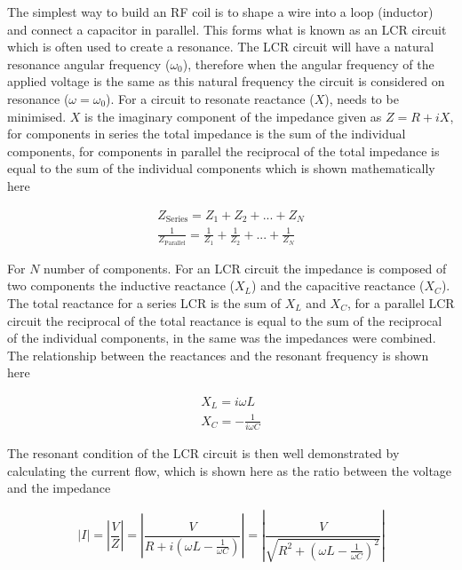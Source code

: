 The simplest way to build an \ac{RF} coil is to shape a wire into a loop (inductor) and connect a capacitor in parallel. This forms what is known as an LCR circuit which is often used to create a resonance. The LCR circuit will have a natural resonance angular frequency ($\omega_0$), therefore when the angular frequency of the applied voltage is the same as this natural frequency the circuit is considered on resonance ($\omega=\omega_0$). For a circuit to resonate reactance ($X$), needs to be minimised. $X$ is the imaginary component of the impedance given as $Z = R+iX$, for components in series the total impedance is the sum of the individual components, for components in parallel the reciprocal of the total impedance is equal to the sum of the individual components which is shown mathematically here 

\begin{equation}
    \begin{gathered}
        Z_\text{Series} = Z_1 + Z_2 + ... + Z_N \\
        \frac{1}{Z_\text{Parallel}} = \frac{1}{Z_1} + \frac{1}{Z_2} + ... + \frac{1}{Z_N}
    \end{gathered}
\end{equation}

For $N$ number of components. For an LCR circuit the impedance is composed of two components the inductive reactance ($X_L$) and the capacitive reactance ($X_C$). The total reactance for a series LCR is the sum of $X_L$ and $X_C$, for a parallel LCR circuit the reciprocal of the total reactance is equal to the sum of the reciprocal of the individual components, in the same was the impedances were combined. The relationship between the reactances and the resonant frequency is shown here

\begin{equation}
\begin{gathered}
    X_L = i\omega L \\
    X_C = -\frac{1}{i\omega C}
    \label{eqn:coils:X}
\end{gathered}
\end{equation}

The resonant condition of the LCR circuit is then well demonstrated by calculating the current flow, which is shown here as the ratio between the voltage and the impedance

\begin{equation}
    |I| = \left| \frac{V}{Z} \right| = \left| \frac{V}{R+i(\omega L - \frac{1}{\omega C})} \right| = \left| \frac{V}{\sqrt{R^2+(\omega L - \frac{1}{\omega C})^2}} \right|
    \label{eqn:coils:I}
\end{equation}


